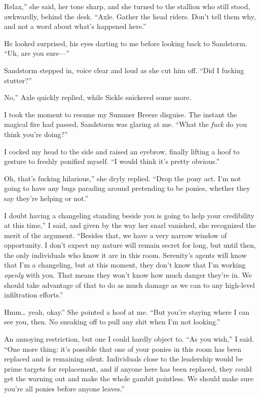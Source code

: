\leavevmode{}Relax,” she said, her tone sharp, and she turned to the stallion who still stood, awkwardly, behind the desk. “Axle. Gather the head riders. Don’t tell them why, and not a word about what’s happened here.”

He looked surprised, his eyes darting to me before looking back to Sandstorm. “Uh, are you sure—”

Sandstorm stepped in, voice clear and loud as she cut him off. “Did I fucking stutter?”

\leavevmode{}No,” Axle quickly replied, while Sickle snickered some more.

I took the moment to resume my Summer Breeze disguise. The instant the magical fire had passed, Sandstorm was glaring at me. “What the \textit{fuck} do you think you’re doing?”

I cocked my head to the side and raised an eyebrow, finally lifting a hoof to gesture to freshly ponified myself. “I would think it’s pretty obvious.”

\leavevmode{}Oh, that’s fucking hilarious,” she dryly replied. “Drop the pony act. I’m not going to have any bugs parading around pretending to be ponies, whether they say they’re helping or not.”

\leavevmode{}I doubt having a changeling standing beside you is going to help your credibility at this time,” I said, and given by the way her snarl vanished, she recognized the merit of the argument. “Besides that, we have a very narrow window of opportunity. I don’t expect my nature will remain secret for long, but until then, the only individuals who know it are in this room. Serenity’s agents will know that I’m a changeling, but at this moment, they don’t know that I’m working \textit{openly} with you. That means they won’t know how much danger they’re in. We should take advantage of that to do as much damage as we can to any high-level infiltration efforts.”

\leavevmode{}Hmm… yeah, okay.” She pointed a hoof at me. “But you’re staying where I can see you, then. No sneaking off to pull any shit when I’m not looking.”

An annoying restriction, but one I could hardly object to. “As you wish,” I said. “One more thing: it’s possible that one of your ponies in this room has been replaced and is remaining silent. Individuals close to the leadership would be prime targets for replacement, and if anyone here has been replaced, they could get the warning out and make the whole gambit pointless. We should make sure you’re all ponies before anyone leaves.”

